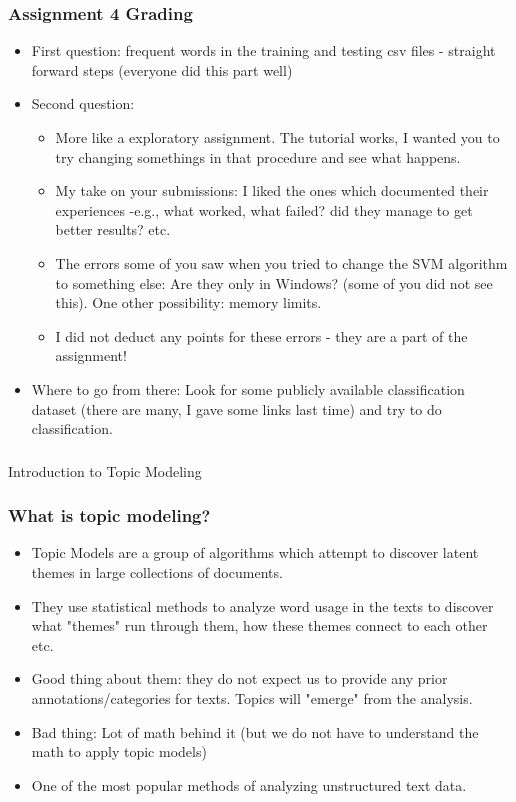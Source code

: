 \documentclass{beamer}
\begin{document}
\begin{frame}
\frametitle{Assignment 4 Grading}
\begin{itemize}
\item First question: frequent words in the training and testing csv files - straight forward steps (everyone did this part well) \pause
\item Second question:
\begin{itemize}
\item More like a exploratory assignment. The tutorial works, I wanted you to try changing somethings in that procedure and see what happens.
\item My take on your submissions: I liked the ones which documented their experiences -e.g., what worked, what failed? did they manage to get better results? etc. 
\item The errors some of you saw when you tried to change the SVM algorithm to something else: Are they only in Windows? (some of you did not see this). One other possibility: memory limits.
\item I did not deduct any points for these errors - they are a part of the assignment! 
\end{itemize}
\item Where to go from there: Look for some publicly available classification dataset (there are many, I gave some links last time) and try to do classification.
\end{itemize}
\end{frame}

\begin{frame}
\frametitle{}
\Large Introduction to Topic Modeling
\end{frame}

\begin{frame}
\frametitle{What is topic modeling?}
\begin{itemize}
\item Topic Models are a group of algorithms which attempt to discover latent themes in large collections of documents.
\item They use statistical methods to analyze word usage in the texts to discover what "themes" run through them, how these themes connect to each other etc. \pause
\item Good thing about them: they do not expect us to provide any prior annotations/categories for texts. Topics will "emerge" from the analysis.
\item Bad thing: Lot of math behind it (but we do not have to understand the math to apply topic models) \pause
\item One of the most popular methods of analyzing unstructured text data. 
\end{itemize}
\end{frame}
\end{document}
